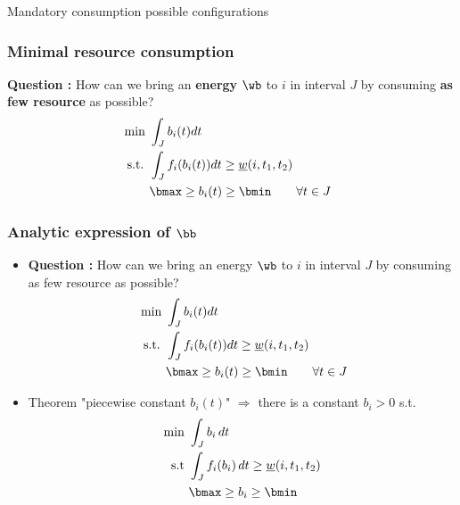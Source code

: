 \begin{frame}{Mandatory consumption possible configurations}
  
\end{frame}

\begin{frame}
  \frametitle{Minimal resource consumption}
  \begin{center}
    
  \end{center}
  \vfill
  \pause
  \textbf{Question : }
  How can we bring an {\bf energy} $\mathbf{\wb}$ to $i$ in interval $J$ by consuming
  {\bf as few resource} as possible? 
  \vfill
  \pause
  \begin{align*}
    \text{ min }& \int_{J} b_i(t)dt  &\\
    \text{ s.t. } & \int_{J}f_i(b_i(t))dt \ge  \underline{w}(i,t_1,t_2)& \\
                &  \bmax \ge b_i(t) \ge \bmin \qquad \forall t \in J
  \end{align*}
  \vfill
\end{frame}

\begin{frame}
  \frametitle{Analytic expression of $\bb$}
  \vfill
  \begin{itemize}
  \item  \textbf{Question : }
    How can we bring an energy $\wb$ to $i$ in interval $J$ by consuming as few resource as possible?
    \vfill
    \begin{align*}
      \text{ min }& \int_{J} b_i(t)dt  \\
      \text{ s.t. } & \int_{J}f_i(b_i(t))dt \ge  \underline{w}(i,t_1,t_2) \\
                  &  \bmax \ge b_i(t) \ge \bmin\qquad \forall t \in J
    \end{align*}
    \vfill
  \item Theorem "piecewise constant $b_i(t)$" $\Rightarrow$ there is a constant $b_{i} > 0 $
    s.t. 
    \pause
    \begin{align*}
      \text{min }  & \int_{J} b_i\,dt  \\
      \text{s.t } & \int_{J}f_i(b_i)\,dt \ge
                    \underline{w}(i,t_1,t_2)\\
                   & \bmax \ge b_i \ge \bmin
    \end{align*}
  \end{itemize}
  \vfill
\end{frame}

